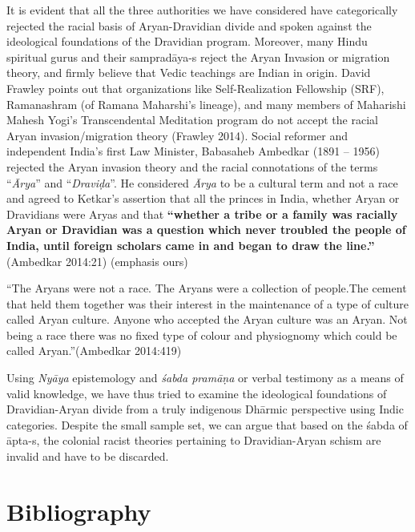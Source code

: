 It is evident that all the three authorities we have considered have categorically rejected the racial basis of Aryan-Dravidian divide and spoken against the ideological foundations of the Dravidian program. Moreover, many Hindu spiritual gurus and their sampradāya-s reject the Aryan Invasion or migration theory, and firmly believe that Vedic teachings are Indian in origin. David Frawley points out that organizations like Self-Realization Fellowship (SRF), Ramanashram (of Ramana Maharshi’s lineage), and many members of Maharishi Mahesh Yogi’s Transcendental Meditation program do not accept the racial Aryan invasion/migration theory (Frawley 2014). Social reformer and independent India’s first Law Minister, Babasaheb Ambedkar (1891 – 1956) rejected the Aryan invasion theory and the racial connotations of the terms “\textit{Ārya}” and “\textit{Draviḍa}”. He considered \textit{Ārya} to be a cultural term and not a race and agreed to Ketkar’s assertion that all the princes in India, whether Aryan or Dravidians were Aryas and that \textbf{“whether a tribe or a family was racially Aryan or Dravidian was a question which never troubled the people of India, until foreign scholars came in and began to draw the line.”} (Ambedkar 2014:21) (emphasis ours)

\begin{myquote}
“The Aryans were not a race. The Aryans were a collection of people.The cement that held them together was their interest in the maintenance of a type of culture called Aryan culture. Anyone who accepted the Aryan culture was an Aryan. Not being a race there was no fixed type of colour and physiognomy which could be called Aryan.”(Ambedkar 2014:419)
\end{myquote}

Using \textit{Nyāya} epistemology and \textit{śabda pramāṇa} or verbal testimony as a means of valid knowledge, we have thus tried to examine the ideological foundations of Dravidian-Aryan divide from a truly indigenous Dhārmic perspective using Indic categories. Despite the small sample set, we can argue that based on the śabda of āpta-s, the colonial racist theories pertaining to Dravidian-Aryan schism are invalid and have to be discarded.


\section*{Bibliography}

